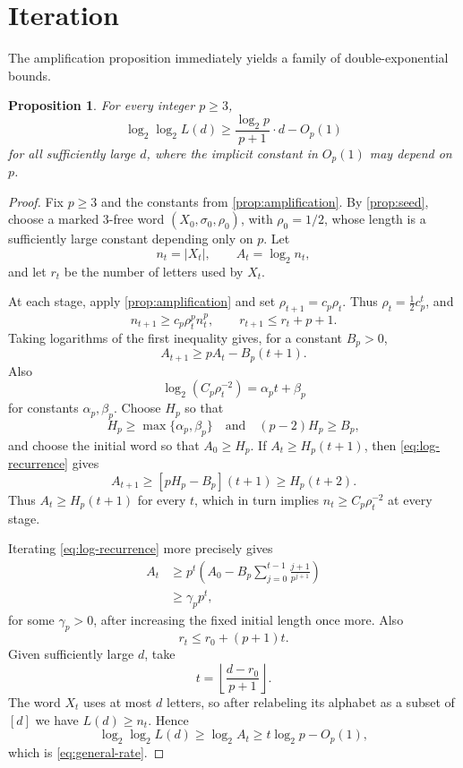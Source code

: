 \documentclass[11pt]{article}
\theoremstyle{plain}
\newtheorem{proposition}{Proposition}[section]
\theoremstyle{definition}
\theoremstyle{remark}
\newcommand{\floor}[1]{\left\lfloor #1\right\rfloor}
\begin{document}
\section{Iteration}\label{sec:iteration}

The amplification proposition immediately yields a family of double-exponential bounds.

\begin{proposition}\label{prop:general-rate}
For every integer $p\ge3$,
\begin{equation}\label{eq:general-rate}
        \log_2\log_2 L(d)
        \ge \frac{\log_2p}{p+1}\cdot d-O_p(1)
\end{equation}
for all sufficiently large \(d\), where the implicit constant in \(O_p(1)\) may depend on \(p\).
\end{proposition}

\begin{proof}
Fix $p\ge3$ and the constants from \cref{prop:amplification}. By \cref{prop:seed}, choose a marked 3-free word \((X_0,\sigma_0,\rho_0)\), with \(\rho_0=1/2\), whose length is a sufficiently large constant depending only on \(p\). Let
\[
        n_t=|X_t|,
        \qquad
        A_t=\log_2 n_t,
\]
and let \(r_t\) be the number of letters used by \(X_t\).

At each stage, apply \cref{prop:amplification} and set \(\rho_{t+1}=c_p\rho_t\). Thus \(\rho_t=\frac12c_p^t\), and
\begin{equation}\label{eq:iteration-recurrence}
        n_{t+1}\ge c_p\rho_t^pn_t^p,
        \qquad
        r_{t+1}\le r_t+p+1.
\end{equation}
Taking logarithms of the first inequality gives, for a constant \(B_p>0\),
\begin{equation}\label{eq:log-recurrence}
        A_{t+1}\ge pA_t-B_p(t+1).
\end{equation}
Also
\[
        \log_2(C_p\rho_t^{-2})=\alpha_pt+\beta_p
\]
for constants \(\alpha_p,\beta_p\). Choose \(H_p\) so that
\[
        H_p\ge\max\{\alpha_p,\beta_p\}
        \quad\text{and}\quad
        (p-2)H_p\ge B_p,
\]
and choose the initial word so that \(A_0\ge H_p\). If \(A_t\ge H_p(t+1)\), then \eqref{eq:log-recurrence} gives
\[
 A_{t+1}\ge [pH_p-B_p](t+1)\ge H_p(t+2).
\]
Thus \(A_t\ge H_p(t+1)\) for every \(t\), which in turn implies \(n_t\ge C_p\rho_t^{-2}\) at every stage.

Iterating \eqref{eq:log-recurrence} more precisely gives
\begin{align*}
        A_t
        &\ge p^t\left(
        A_0-B_p\sum_{j=0}^{t-1}\frac{j+1}{p^{j+1}}
        \right)\\
        &\ge \gamma_pp^t,
\end{align*}
for some \(\gamma_p>0\), after increasing the fixed initial length once more. Also
\[
        r_t\le r_0+(p+1)t.
\]
Given sufficiently large $d$, take
\[
        t=\floor{\frac{d-r_0}{p+1}}.
\]
The word \(X_t\) uses at most \(d\) letters, so after relabeling its alphabet as a subset of \([d]\) we have \(L(d)\ge n_t\). Hence
\[
        \log_2\log_2L(d)
        \ge \log_2A_t
        \ge t\log_2p-O_p(1),
\]
which is \eqref{eq:general-rate}.
\end{proof}
\end{document}
